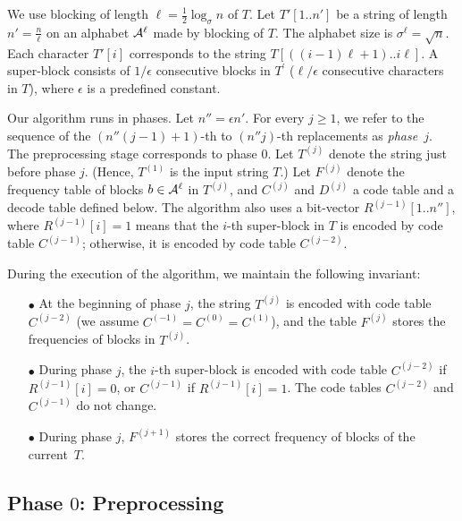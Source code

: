 \documentclass{llncs}
\begin{document}
We use blocking of length $\ell = \frac{1}{2}\log_{\sigma} n$ of $T$.
Let $T'[1..n']$ be a string of length $n' = \frac{n}{\ell}$ on an alphabet 
${\cal A}^\ell$
made by blocking of $T$.
The alphabet size is $\sigma^\ell = \sqrt{n}$.
Each character $T'[i]$ corresponds to the string $T[((i-1)\ell + 1)..i\ell]$.
A super-block consists of $1/\epsilon$ consecutive blocks in $T^\prime$
($\ell/\epsilon$ consecutive characters in $T$),
where $\epsilon$ is a predefined constant.

Our algorithm runs in phases.
Let $n'' = \epsilon n'$.
For every $j \ge 1$, we refer to the sequence of the $(n'' (j-1) + 1)$-th to
$(n'' j)$-th replacements as \emph{phase~$j$}.
The preprocessing stage corresponds to phase $0$.
Let $T^{(j)}$ denote the string just before phase $j$.  (Hence, $T^{(1)}$ is the input string $T$.)
Let $F^{(j)}$ denote the frequency table of blocks $b \in {\cal A}^\ell$ 
in $T^{(j)}$, 
and $C^{(j)}$ and $D^{(j)}$ a code table and a decode table defined below.
The algorithm also uses a bit-vector $R^{(j-1)}[1..n'']$,
where $R^{(j-1)}[i]=1$ means that the $i$-th super-block in $T$
is encoded by code table $C^{(j-1)}$; otherwise, it is encoded
by code table $C^{(j-2)}$.

During the execution of the algorithm, we maintain the following invariant:
\begin{itemize}
\item[{\raise0.3pt\hbox{$\bullet$}}]
At the beginning of phase $j$, the string $T^{(j)}$ is encoded with
code table $C^{(j-2)}$ (we assume $C^{(-1)} = C^{(0)} = C^{(1)}$), and
the table $F^{(j)}$ stores the frequencies of blocks in $T^{(j)}$.
\item[{\raise0.3pt\hbox{$\bullet$}}]
During phase $j$, the $i$-th super-block is encoded with
code table $C^{(j-2)}$ if $R^{(j-1)}[i]=0$, or $C^{(j-1)}$ if $R^{(j-1)}[i]=1$.
The code tables $C^{(j-2)}$ and $C^{(j-1)}$ do not change.\item[{\raise0.3pt\hbox{$\bullet$}}]
During phase $j$, $F^{(j+1)}$ stores the correct frequency of blocks
of the current~$T$.
\end{itemize}

\subsection{Phase $0$: Preprocessing}
\end{document}
